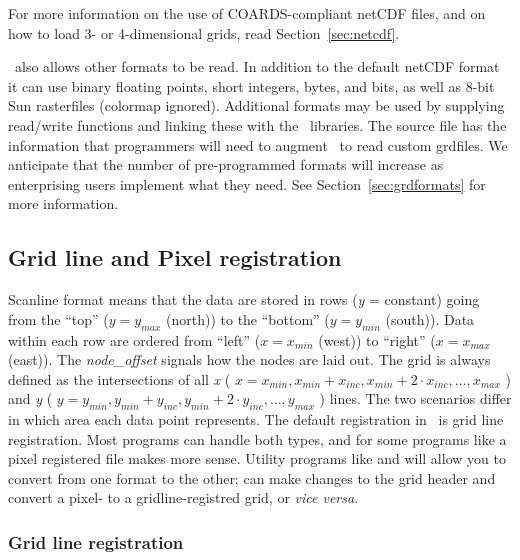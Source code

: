 For more information on the use of COARDS-compliant netCDF files, and on how to load
3- or 4-dimensional grids, read Section~\ref{sec:netcdf}.


\GMT\ also allows other formats to be read.  In addition to
the default netCDF format it can use binary floating points, short
integers, bytes, and bits, as well as 8-bit Sun rasterfiles (colormap
ignored).   Additional formats may be used by supplying read/write
functions and linking these with the \GMT\ libraries.
The source file  has the information that
programmers will need to augment \GMT\ to read custom grdfiles.  We
anticipate that the number of pre-programmed formats will increase as
enterprising users implement what they need.  See Section~\ref{sec:grdformats}
for more information.

\subsection{Grid line and Pixel registration} 

Scanline format means that the data are stored in rows (\emph{y} = constant)
going from the ``top'' ($y = y_{max}$ (north)) to the ``bottom''
($y = y_{min}$ (south)).  Data within each row are ordered from
``left'' ($x = x_{min}$ (west)) to ``right'' ($x = x_{max}$
(east)).  The \emph{node\_offset} signals how the nodes are laid out.
The grid is always defined as the intersections of all \emph{x}
( \( x = x_{min}, x_{min} + x_{inc}, x_{min} + 2 \cdot x_{inc}, \ldots, x_{max} \) )
and \emph{y} ( \( y = y_{min}, y_{min} + y_{inc}, y_{min} + 2 \cdot y_{inc}, \ldots, y_{max} \) )
lines.  The two scenarios differ in which area each data point
represents.
The default registration in \GMT\ is grid line registration.  Most
programs can handle both types, and for some programs like 
a pixel registered file makes more sense.  Utility programs like
 and  will allow you to convert
from one format to the other;  can make changes to the grid header
and convert a pixel- to a gridline-registred grid, or \emph{vice versa}.

\subsubsection{Grid line registration}

